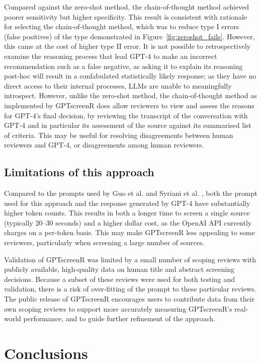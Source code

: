 \documentclass[10pt,a4paper,twocolumn]{article}
\begin{document}
Compared against the zero-shot method, the chain-of-thought method achieved poorer sensitivity but higher specificity. This result is consistent with rationale for selecting the chain-of-thought method, which was to reduce type I errors (false positives) of the type demonstrated in Figure~\ref{fig:zeroshot_fails}. However, this came at the cost of higher type II error. It is not possible to retrospectively examine the reasoning process that lead GPT-4 to make an incorrect recommendation such as a false negative, as asking it to explain its reasoning post-hoc will result in a confabulated statistically likely response; as they have no direct access to their internal processes, LLMs are unable to meaningfully introspect. However, unlike the zero-shot method, the chain-of-thought method as implemented by GPTscreenR does allow reviewers to view and assess the reasons for GPT-4's final decision, by reviewing the transcript of the conversation with GPT-4 and in particular its assessment of the source against its summarised list of criteria. This may be useful for resolving disagreements between human reviewers and GPT-4, or disagreements among human reviewers.

\subsection{Limitations of this approach}

Compared to the prompts used by Guo et al. \cite{Guo.2023} and Syriani et al. \cite{Syriani.2023}, both the prompt used for this approach and the response generated by GPT-4 have substantially higher token counts. This results in both a longer time to screen a single source (typically 20--30 seconds) and a higher dollar cost, as the OpenAI API currently charges on a per-token basis. This may make GPTscreenR less appealing to some reviewers, particularly when screening a large number of sources.

Validation of GPTscreenR was limited by a small number of scoping reviews with publicly available, high-quality data on human title and abstract screening decisions. Because a subset of these reviews were used for both testing and validation, there is a risk of over-fitting of the prompt to these particular reviews. The public release of GPTscreenR encourages users to contribute data from their own scoping reviews to support more accurately measuring GPTscreenR's real-world performance, and to guide further refinement of the approach.

\section{Conclusions}
\end{document}
